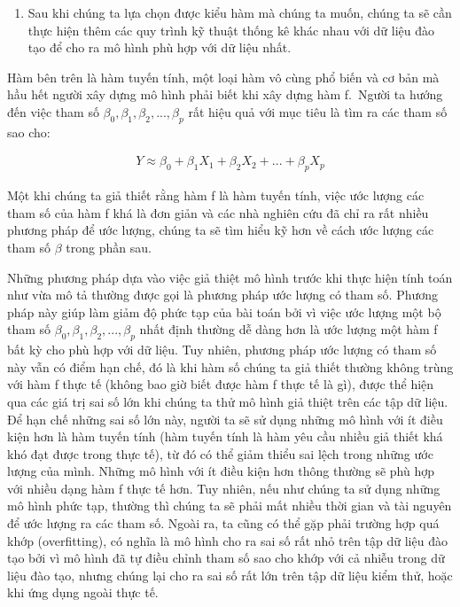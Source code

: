 \documentclass[
  12pt,
]{krantz}
\providecommand{\tightlist}{%
  \setlength{\itemsep}{0pt}\setlength{\parskip}{0pt}}
\begin{document}
\begin{enumerate}
\def\labelenumi{\arabic{enumi}.}
\setcounter{enumi}{1}
\tightlist
\item
  Sau khi chúng ta lựa chọn được kiểu hàm mà chúng ta muốn, chúng ta sẽ cần thực hiện thêm các quy trình kỹ thuật thống kê khác nhau với dữ liệu đào tạo để cho ra mô hình phù hợp với dữ liệu nhất.
\end{enumerate}

Hàm bên trên là hàm tuyến tính, một loại hàm vô cùng phổ biến và cơ bản mà hầu hết người xây dựng mô hình phải biết khi xây dựng hàm f.~Người ta hướng đến việc tham số \(\beta_0, \beta_1, \beta_2, ... , \beta_p\) rất hiệu quả với mục tiêu là tìm ra các tham số sao cho:

\begin{align}
Y \approx \beta_0 + \beta_1 X_1 + \beta_2 X_2 + ... + \beta_p X_p
\end{align}

Một khi chúng ta giả thiết rằng hàm f là hàm tuyến tính, việc ước lượng các tham số của hàm f khá là đơn giản và các nhà nghiên cứu đã chỉ ra rất nhiều phương pháp để ước lượng, chúng ta sẽ tìm hiểu kỹ hơn về cách ước lượng các tham số \(\beta\) trong phần sau.

Những phương pháp dựa vào việc giả thiệt mô hình trước khi thực hiện tính toán như vừa mô tả thường được gọi là phương pháp ước lượng có tham số. Phương pháp này giúp làm giảm độ phức tạp của bài toán bởi vì việc ước lượng một bộ tham số \(\beta_0, \beta_1, \beta_2, ... , \beta_p\) nhất định thường dễ dàng hơn là ước lượng một hàm f bất kỳ cho phù hợp với dữ liệu. Tuy nhiên, phương pháp ước lượng có tham số này vẫn có điểm hạn chế, đó là khi hàm số chúng ta giả thiết thường không trùng với hàm f thực tế (không bao giờ biết được hàm f thực tế là gì), được thể hiện qua các giá trị sai số lớn khi chúng ta thử mô hình giả thiệt trên các tập dữ liệu. Để hạn chế những sai số lớn này, người ta sẽ sử dụng những mô hình với ít điều kiện hơn là hàm tuyến tính (hàm tuyến tính là hàm yêu cầu nhiều giả thiết khá khó đạt được trong thực tế), từ đó có thể giảm thiểu sai lệch trong những ước lượng của mình. Những mô hình với ít điều kiện hơn thông thường sẽ phù hợp với nhiều dạng hàm f thực tế hơn. Tuy nhiên, nếu như chúng ta sử dụng những mô hình phức tạp, thường thì chúng ta sẽ phải mất nhiều thời gian và tài nguyên để ước lượng ra các tham số. Ngoài ra, ta cũng có thể gặp phải trường hợp quá khớp (overfitting), có nghĩa là mô hình cho ra sai số rất nhỏ trên tập dữ liệu đào tạo bởi vì mô hình đã tự điều chỉnh tham số sao cho khớp với cả nhiễu trong dữ liệu đào tạo, nhưng chúng lại cho ra sai số rất lớn trên tập dữ liệu kiểm thử, hoặc khi ứng dụng ngoài thực tế.
\end{document}
